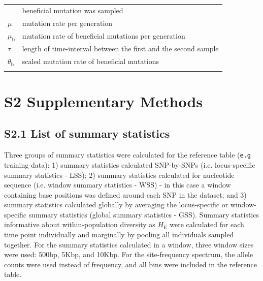 \documentclass[a4paper, 12pt]{article}
\begin{document}
\begin{table}[ht]
\begin{tabular}{ll}
                            & beneficial mutation was sampled\\
    $\mu$                   & mutation rate per generation\\
    $\mu_{\mathrm{b}}$      & mutation rate of beneficial mutations per generation\\
    $\tau$                  & length of time-interval between the first and the second sample\\
    $\theta_{\mathrm{b}}$   & scaled mutation rate of beneficial mutations\\
&\\
    
    \bottomrule
  \end{tabular}
  \label{tab:supple_symbols}
\end{table}

\section*{S2 Supplementary Methods}

\subsection*{S2.1 List of summary statistics}

Three groups of summary statistics were calculated for the reference table (\texttt{e.g} training data): 1) summary statistics calculated SNP-by-SNPs (i.e. locus-specific summary statistics - LSS); 2) summary statistics calculated for nucleotide sequence (i.e. window summary statistics - WSS) - in this case a window containing base positions was defined around each SNP in the dataset; and 3) summary statistics calculated globally by averaging the locus-specific or window-specific summary statistics (global summary statistics - GSS). Summary statistics informative about within-population diversity as $H_{\mathrm{E}}$ were calculated for each time point individually and marginally by pooling all individuals sampled together. For the summary statistics calculated in a window, three window sizes were used: 500bp, 5Kbp, and 10Kbp. For the site-frequency spectrum, the allele counts were used instead of frequency, and all bins were included in the reference table.
\end{document}
